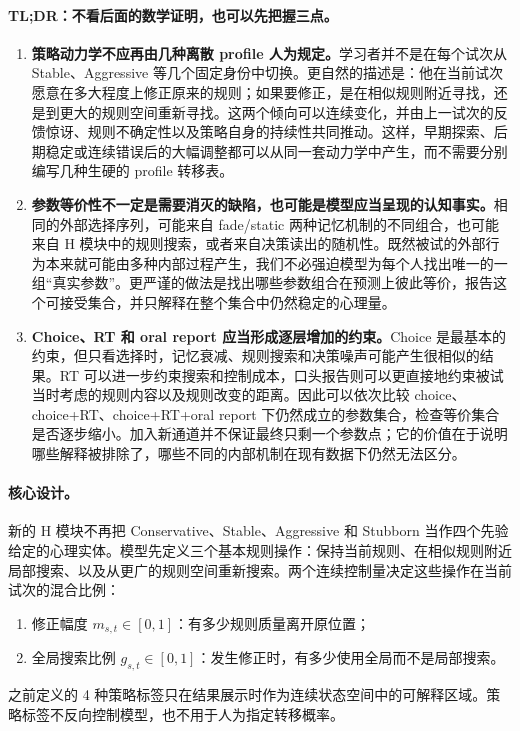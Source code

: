 \paragraph{TL;DR：不看后面的数学证明，也可以先把握三点。}
\begin{enumerate}
    \item \textbf{策略动力学不应再由几种离散 profile 人为规定。}学习者并不是在每个试次从 Stable、Aggressive 等几个固定身份中切换。更自然的描述是：他在当前试次愿意在多大程度上修正原来的规则；如果要修正，是在相似规则附近寻找，还是到更大的规则空间重新寻找。这两个倾向可以连续变化，并由上一试次的反馈惊讶、规则不确定性以及策略自身的持续性共同推动。这样，早期探索、后期稳定或连续错误后的大幅调整都可以从同一套动力学中产生，而不需要分别编写几种生硬的 profile 转移表。
    \item \textbf{参数等价性不一定是需要消灭的缺陷，也可能是模型应当呈现的认知事实。}相同的外部选择序列，可能来自 fade/static 两种记忆机制的不同组合，也可能来自 H 模块中的规则搜索，或者来自决策读出的随机性。既然被试的外部行为本来就可能由多种内部过程产生，我们不必强迫模型为每个人找出唯一的一组“真实参数”。更严谨的做法是找出哪些参数组合在预测上彼此等价，报告这个可接受集合，并只解释在整个集合中仍然稳定的心理量。
    \item \textbf{Choice、RT 和 oral report 应当形成逐层增加的约束。}Choice 是最基本的约束，但只看选择时，记忆衰减、规则搜索和决策噪声可能产生很相似的结果。RT 可以进一步约束搜索和控制成本，口头报告则可以更直接地约束被试当时考虑的规则内容以及规则改变的距离。因此可以依次比较 choice、choice+RT、choice+RT+oral report 下仍然成立的参数集合，检查等价集合是否逐步缩小。加入新通道并不保证最终只剩一个参数点；它的价值在于说明哪些解释被排除了，哪些不同的内部机制在现有数据下仍然无法区分。
\end{enumerate}

\paragraph{核心设计。}
新的 H 模块不再把 Conservative、Stable、Aggressive 和 Stubborn 当作四个先验给定的心理实体。模型先定义三个基本规则操作：保持当前规则、在相似规则附近局部搜索、以及从更广的规则空间重新搜索。两个连续控制量决定这些操作在当前试次的混合比例：
\begin{enumerate}
    \item 修正幅度 $m_{s,t}\in[0,1]$：有多少规则质量离开原位置；
    \item 全局搜索比例 $g_{s,t}\in[0,1]$：发生修正时，有多少使用全局而不是局部搜索。
\end{enumerate}
之前定义的 4 种策略标签只在结果展示时作为连续状态空间中的可解释区域。策略标签不反向控制模型，也不用于人为指定转移概率。


